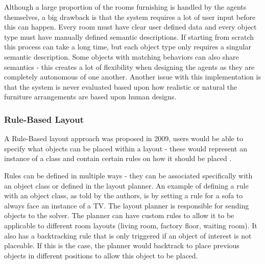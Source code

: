 
Although a large proportion of the rooms furnishing is handled by the agents themselves, a big drawback is that the system requires a lot of user input before this can happen. Every room must have clear user defined data and every object type must have manually defined semantic descriptions. If starting from scratch this process can take a long time, but each object type only requires a singular semantic description. Some objects with matching behaviors can also share semantics - this creates a lot of flexibility when designing the agents as they are completely autonomous of one another\cite{real-time-walkthroughs}.
Another issue with this implementation is that the system is never evaluated based upon how realistic or natural the furniture arrangements are based upon human designs. 


\bigskip
\subsubsection{Rule-Based Layout}
A Rule-Based layout approach was proposed in 2009, users would be able to specify what objects can be placed within a layout - these would represent an instance of a class and contain certain rules on how it should be placed \cite{rule-based-layout}.


Rules can be defined in multiple ways - they can be associated specifically with an object class or defined in the layout planner. An example of defining a rule with an object class, as told by the authors, is by setting a rule for a sofa to always face an instance of a TV. The layout planner is responsible for sending objects to the solver. The planner can have custom rules to allow it to be applicable to different room layouts (living room, factory floor, waiting room). It also has a backtracking rule that is only triggered if an object of interest is not placeable. If this is the case, the planner would backtrack to place previous objects in different positions to allow this object to be placed.

